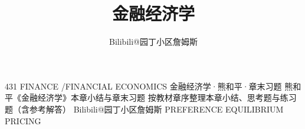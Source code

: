 \documentclass[fontset=none]{exam-zh}
\title{金融经济学}
\author{Bilibili@园丁小区詹姆斯}
\begin{document}
\FourThreeOneFrontMatter

\ifdefined\FourThreeOnePrintInterior
\else
\MakeFourThreeOneCover
    {431 FINANCE \quad/\quad FINANCIAL ECONOMICS}
    {金融经济学·熊和平·章末习题}
    {熊和平《金融经济学》本章小结与章末习题}
    {按教材章序整理本章小结、思考题与练习题（含参考解答）}
    {Bilibili@园丁小区詹姆斯}
    {PREFERENCE \quad EQUILIBRIUM \quad PRICING}

\null
\thispagestyle{empty}
\fi

\MakeFourThreeOneContents[2]

\cleardoublepage

\setcounter{chapter}{0}
















\appendix

\end{document}
